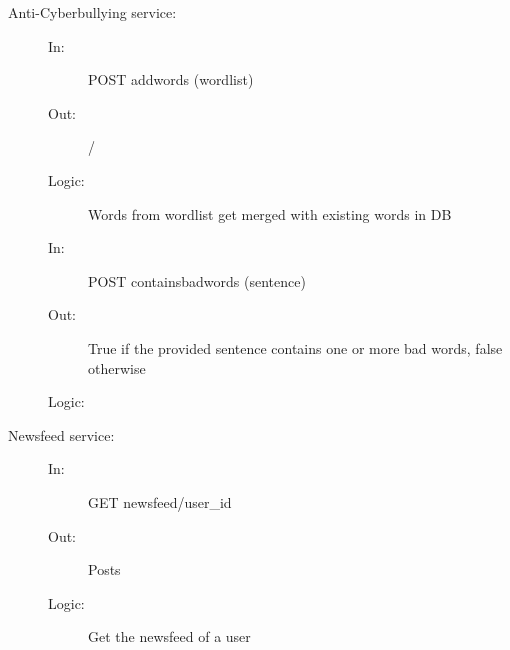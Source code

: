 \documentclass{article}
\begin{document}
\begin{description}
    \item [Anti-Cyberbullying service:] 
    \begin{description}
        \item[]
        \item[In:] POST addwords (wordlist)
        \item[Out:] /
        \item[Logic:] Words from wordlist get merged with existing words in DB
        \item[]
        
        \item[In:] POST containsbadwords (sentence)
        \item[Out:] True if the provided sentence contains one or more bad words, false otherwise
        \item[Logic:] 
    \end{description}
\end{description}

\begin{description}
    \item [Newsfeed service:] 
    \begin{description}
        \item[]
        \item[In:] GET newsfeed/user\_id
        \item[Out:] Posts
        \item[Logic:] Get the newsfeed of a user
    \end{description}
\end{description}
\end{document}
